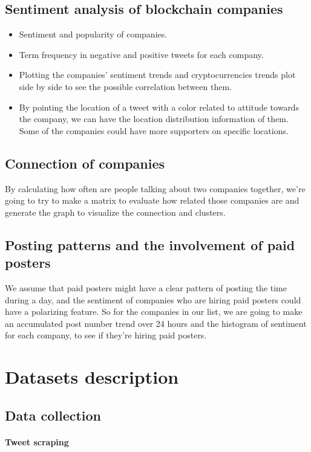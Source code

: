 \documentclass{article}
\begin{document}
\subsection{Sentiment analysis of blockchain companies}
\begin{itemize}
\item Sentiment and popularity of companies.
\item Term frequency in negative and positive tweets for each company.
\item Plotting the companies' sentiment trends and cryptocurrencies trends plot side by side to see the possible correlation between them.
\item By pointing the location of a tweet with a color related to attitude towards the company, we can have the location distribution information of them. Some of the companies could have more supporters on specific locations.
\end{itemize}

\subsection{Connection of companies}
By calculating how often are people talking about two companies together, we're going to try to make a matrix to evaluate how related those companies are and generate the graph to visualize the connection and clusters.

\subsection{Posting patterns and the involvement of paid posters}
We assume that paid posters might have a clear pattern of posting the time during a day, and the sentiment of companies who are hiring paid posters could have a polarizing feature. So for the companies in our list, we are going to make an accumulated post number trend over 24 hours and the histogram of sentiment for each company, to see if they're hiring paid posters.

\section{Datasets description}
\subsection{Data collection}
\paragraph{Tweet scraping} 
\end{document}
